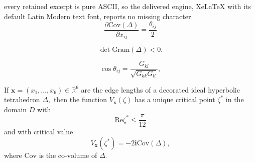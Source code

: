 \documentclass[10pt,a4paper]{amsart}
\begin{document}
every retained excerpt is pure ASCII, so the delivered engine, XeLaTeX with its default Latin Modern text font, reports no missing character.
\begin{equation}\label{co-sch}
    \frac{\partial \mathrm{Cov}(\Delta)}{\partial x_{ij}}=\frac{\theta_{ij}}{2}
\end{equation}

\begin{equation}\label{det-}
   \det\mathrm{Gram}(\Delta)<0.
\end{equation}

\begin{equation}\label{cos}
    \cos\theta_{ij}=\frac{G_{kl}}{\sqrt{G_{kk}G_{ll}}},
\end{equation}

\begin{proposition}\label{critical2}
    If $\boldsymbol x=(x_1,\dots, x_6)\in\mathbb R^6$  are the edge lengths of a decorated ideal hyperbolic tetrahedron $\Delta,$ then the function $V_{\boldsymbol x}(\zeta)$ has a unique critical point $\zeta^*$ in the domain $D$ with 
    \begin{equation}\label{12}
    \mathrm{Re}\zeta^*\leqslant \frac{\pi}{12}   
    \end{equation}
    and with critical value
    $$V_{\boldsymbol x}(\zeta^*)=-2\mathbf i \mathrm{Cov}(\Delta),$$
    where $\mathrm{Cov}$ is the co-volume of $\Delta.$
\end{proposition}
\end{document}

